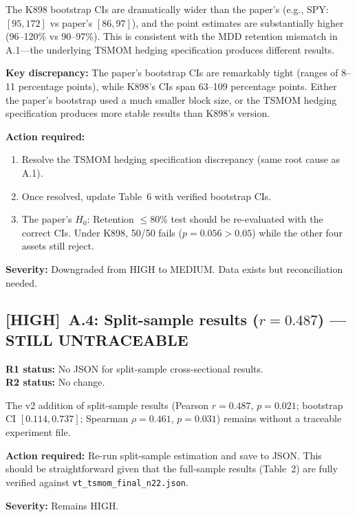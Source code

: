 \documentclass[12pt,a4paper]{article}
\newcommand{\HIGH}{\textcolor{highsev}{\textbf{[HIGH]}}}
\begin{document}
The K898 bootstrap CIs are dramatically wider than the paper's (e.g., SPY: $[95, 172]$ vs paper's $[86, 97]$), and the point estimates are substantially higher (96--120\% vs 90--97\%). This is consistent with the MDD retention mismatch in A.1---the underlying TSMOM hedging specification produces different results.

\textbf{Key discrepancy:} The paper's bootstrap CIs are remarkably tight (ranges of 8--11 percentage points), while K898's CIs span 63--109 percentage points. Either the paper's bootstrap used a much smaller block size, or the TSMOM hedging specification produces more stable results than K898's version.

\textbf{Action required:}
\begin{enumerate}[nosep]
\item Resolve the TSMOM hedging specification discrepancy (same root cause as A.1).
\item Once resolved, update Table~6 with verified bootstrap CIs.
\item The paper's $H_0$: Retention $\leq 80\%$ test should be re-evaluated with the correct CIs. Under K898, 50/50 fails ($p = 0.056 > 0.05$) while the other four assets still reject.
\end{enumerate}

\textbf{Severity:} \textcolor{fixedblue}{Downgraded from HIGH to MEDIUM.} Data exists but reconciliation needed.

\bigskip


\subsection{\HIGH\ A.4: Split-sample results ($r = 0.487$) --- STILL UNTRACEABLE}

\textbf{R1 status:} No JSON for split-sample cross-sectional results.\\
\textbf{R2 status:} \textcolor{highsev}{No change.}

The v2 addition of split-sample results (Pearson $r = 0.487$, $p = 0.021$; bootstrap CI $[0.114, 0.737]$; Spearman $\rho = 0.461$, $p = 0.031$) remains without a traceable experiment file.

\textbf{Action required:} Re-run split-sample estimation and save to JSON. This should be straightforward given that the full-sample results (Table~2) are fully verified against \texttt{vt\_tsmom\_final\_n22.json}.

\textbf{Severity:} \textcolor{highsev}{Remains HIGH.}
\end{document}
